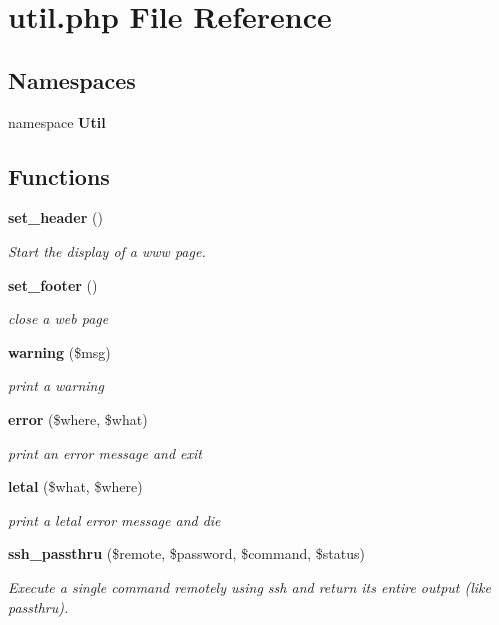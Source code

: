 \section{util.php File Reference}
\label{src_2util_8php}
\subsection*{Namespaces}
\begin{CompactItemize}
\item 
namespace {\bf Util}
\end{CompactItemize}
\subsection*{Functions}
\begin{CompactItemize}
\item 
{\bf set\_\-header} ()
\begin{CompactList}\small\item\em Start the display of a www page. \item\end{CompactList}\item 
{\bf set\_\-footer} ()
\begin{CompactList}\small\item\em close a web page \item\end{CompactList}\item 
{\bf warning} (\$msg)
\begin{CompactList}\small\item\em print a warning \item\end{CompactList}\item 
{\bf error} (\$where, \$what)
\begin{CompactList}\small\item\em print an error message and exit \item\end{CompactList}\item 
{\bf letal} (\$what, \$where)
\begin{CompactList}\small\item\em print a letal error message and die \item\end{CompactList}\item 
{\bf ssh\_\-passthru} (\$remote, \$password, \$command, \$status)
\begin{CompactList}\small\item\em Execute a single command remotely using ssh and return its entire output (like passthru). \item\end{CompactList}\item 

\end{CompactItemize}
